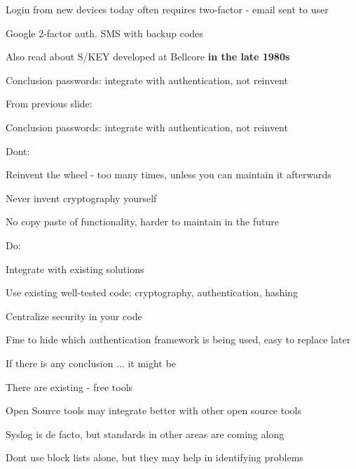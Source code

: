 \documentclass[20pt,landscape,a4paper,footrule]{foils}
\begin{document}

\begin{list1}
\item Login from new devices today often requires two-factor - email sent to user
\item Google 2-factor auth. SMS with backup codes
\item Also read about S/KEY developed at Bellcore {\bf in the late 1980s}\\ 
\end{list1}

\centerline{Conclusion passwords: integrate with authentication, not reinvent}


From previous slide:\\
\centerline{Conclusion passwords: integrate with authentication, not reinvent}


\begin{list1}
\item Dont:
\begin{list2}
\item Reinvent the wheel - too many times, unless you can maintain it afterwards
\item Never invent cryptography yourself
\item No copy paste of functionality, harder to maintain in the future
\end{list2}
\item Do:
\begin{list2}
\item Integrate with existing solutions
\item Use existing well-tested code: cryptography, authentication, hashing
\item Centralize security in your code
\item Fine to hide which authentication framework is being used, easy to replace later
\end{list2}
\end{list1}


\begin{list1}
\item If there is any conclusion ... it might be
\item There are existing - free tools
\item Open Source tools may integrate better with other open source tools
\item Syslog is de facto, but standards in other areas are coming along
\item Dont use block lists alone, but they may help in identifying problems
\end{list1}


\myquestionspage
\end{document}
